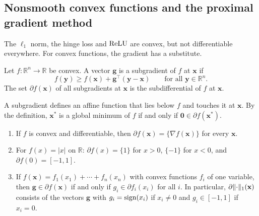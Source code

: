 \subsection{Nonsmooth convex functions and the proximal gradient method}\label{L3-sec:prox}

The $\ell_1$ norm, the hinge loss and $\operatorname{ReLU}$ are convex, but not differentiable everywhere. For convex functions, the gradient has a substitute.

\begin{definition}[Subgradient]\label{L3-def:subgradient}
    Let $f: \mathbb{R}^n \to \mathbb{R}$ be convex. A vector $\mathbf{g}$ is a subgradient of $f$ at $\mathbf{x}$ if
    \[f(\mathbf{y}) \geq f(\mathbf{x}) + \mathbf{g}^\top(\mathbf{y} - \mathbf{x}) \qquad \text{for all } \mathbf{y} \in \mathbb{R}^n.\]
    The set $\partial f(\mathbf{x})$ of all subgradients at $\mathbf{x}$ is the subdifferential of $f$ at $\mathbf{x}$.
\end{definition}

A subgradient defines an affine function that lies below $f$ and touches it at $\mathbf{x}$. By the definition, $\mathbf{x}^*$ is a global minimum of $f$ if and only if $\mathbf{0} \in \partial f(\mathbf{x}^*)$.

\begin{proposition}\label{L3-prop:subgradients}
    \begin{enumerate}
        \item If $f$ is convex and differentiable, then $\partial f(\mathbf{x}) = \{\nabla f(\mathbf{x})\}$ for every $\mathbf{x}$.
        \item For $f(x) = |x|$ on $\mathbb{R}$: $\partial f(x) = \{1\}$ for $x > 0$, $\{-1\}$ for $x < 0$, and $\partial f(0) = [-1, 1]$.
        \item If $f(\mathbf{x}) = f_1(x_1) + \cdots + f_n(x_n)$ with convex functions $f_i$ of one variable, then $\mathbf{g} \in \partial f(\mathbf{x})$ if and only if $g_i \in \partial f_i(x_i)$ for all $i$. In particular, $\partial\lVert \cdot \rVert_1(\mathbf{x})$ consists of the vectors $\mathbf{g}$ with $g_i = \operatorname{sign}(x_i)$ if $x_i \neq 0$ and $g_i \in [-1, 1]$ if $x_i = 0$.
    \end{enumerate}
\end{proposition}

